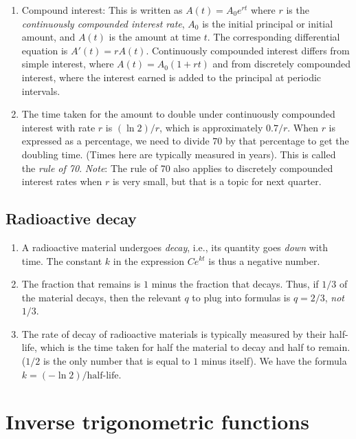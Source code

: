 \documentclass[10pt]{amsart}
\begin{document}
\begin{enumerate}
\item Compound interest: This is written as $A(t) = A_0 e^{rt}$ where
  $r$ is the {\em continuously compounded interest rate}, $A_0$ is the
  initial principal or initial amount, and $A(t)$ is the amount at
  time $t$. The corresponding differential equation is $A'(t) =
  rA(t)$. Continuously compounded interest differs from simple interest,
  where $A(t) = A_0(1 + rt)$ and from discretely compounded interest,
  where the interest earned is added to the principal at periodic
  intervals.
\item The time taken for the amount to double under continuously
  compounded interest with rate $r$ is $(\ln 2)/r$, which is
  approximately $0.7/r$. When $r$ is expressed as a percentage, we
  need to divide $70$ by that percentage to get the doubling
  time. (Times here are typically measured in years). This is called
  the {\em rule of 70}. {\em Note}: The rule of 70 also applies to
  discretely compounded interest rates when $r$ is very small, but
  that is a topic for next quarter.
\end{enumerate}

\subsection{Radioactive decay}

\begin{enumerate}
\item A radioactive material undergoes {\em decay}, i.e., its quantity
  goes {\em down} with time. The constant $k$ in the expression
  $Ce^{kt}$ is thus a negative number.
\item The fraction that remains is $1$ minus the fraction that
  decays. Thus, if $1/3$ of the material decays, then the relevant $q$
  to plug into formulas is $q = 2/3$, {\em not} $1/3$.
\item The rate of decay of radioactive materials is typically measured
  by their half-life, which is the time taken for half the material to
  decay and half to remain. ($1/2$ is the only number that is equal to
  $1$ minus itself). We have the formula $k = (-\ln
  2)/\text{half-life}$.
\end{enumerate}

\section{Inverse trigonometric functions}
\end{document}
